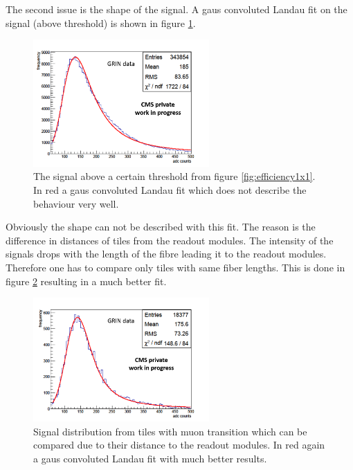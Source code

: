 			The second issue is the shape of the signal.
			A gaus convoluted Landau fit on the signal (above threshold) is shown in figure \ref{fig:langaus_bad}.
			\begin{figure}[htbp]
				\centering
				\includegraphics[width=0.60\textwidth]{Figures/erdogan/langaus_bad.png}
				\caption{The signal above a certain threshold from figure \ref{fig:efficiency1x1}. In red a gaus convoluted Landau fit which does not describe the behaviour very well.}
				\label{fig:langaus_bad}
			\end{figure}
			Obviously the shape can not be described with this fit.
			The reason is the difference in distances of tiles from the readout modules.
			The intensity of the signals drops with the length of the fibre leading it to the readout modules.
			Therefore one has to compare only tiles with same fiber lengths.
			This is done in figure \ref{fig:langaus_good} resulting in a much better fit.
			\begin{figure}[htbp]
				\centering
				\includegraphics[width=0.60\textwidth]{Figures/erdogan/langaus_good.png}
				\caption{Signal distribution from tiles with muon transition which can be compared due to their distance to the readout modules. In red again a gaus convoluted Landau fit with much better
				results.}
				\label{fig:langaus_good}
			\end{figure}
